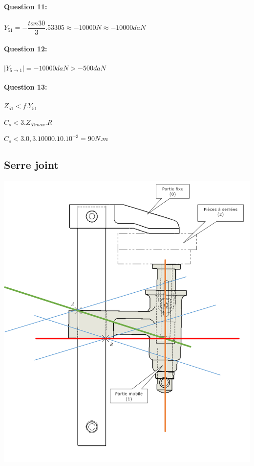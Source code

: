 \paragraph{Question 11:}

$Y_{51}=-\dfrac{tan 30}{3}.53305\approx -10000N\approx -10000daN$

\paragraph{Question 12:}

$|Y_{5\rightarrow 1}|=-10000daN>-500daN$

\paragraph{Question 13:}

$Z_{51}<f.Y_{51}$

$C_{s}<3.Z_{51max}.R$

$C_{s}<3.0,3.10000.10.10^{-3}=90N.m$

\subsection{Serre joint}

\begin{center}
 \includegraphics[width=0.8\linewidth]{img/graph_cor}
\end{center}

